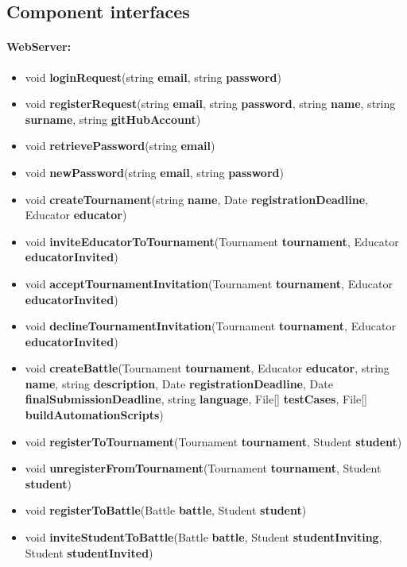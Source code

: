 \documentclass{article}
\begin{document}
\newpage

\subsection{Component interfaces}

\paragraph{WebServer:}

\begin{itemize}
    \item void \textbf{loginRequest}(string \textbf{email}, string \textbf{password})
    \item void \textbf{registerRequest}(string \textbf{email}, string \textbf{password}, string \textbf{name}, string \textbf{surname}, string \textbf{gitHubAccount})
    \item void \textbf{retrievePassword}(string \textbf{email})
    \item void \textbf{newPassword}(string \textbf{email}, string \textbf{password})
    \item void \textbf{createTournament}(string \textbf{name}, Date \textbf{registrationDeadline}, Educator \textbf{educator})
    \item void \textbf{inviteEducatorToTournament}(Tournament \textbf{tournament}, Educator \textbf{educatorInvited})
    \item void \textbf{acceptTournamentInvitation}(Tournament \textbf{tournament}, 
    Educator \textbf{educatorInvited})
    \item void \textbf{declineTournamentInvitation}(Tournament \textbf{tournament},
    Educator \textbf{educatorInvited})
    \item void \textbf{createBattle}(Tournament \textbf{tournament}, Educator \textbf{educator}, string \textbf{name}, 
    string \textbf{description}, Date \textbf{registrationDeadline}, Date \textbf{finalSubmissionDeadline}, 
    string \textbf{language}, File[] \textbf{testCases}, File[] \textbf{buildAutomationScripts})
    \item void \textbf{registerToTournament}(Tournament \textbf{tournament}, Student \textbf{student})
    \item void \textbf{unregisterFromTournament}(Tournament \textbf{tournament}, Student \textbf{student})
    \item void \textbf{registerToBattle}(Battle \textbf{battle}, Student \textbf{student})
    \item void \textbf{inviteStudentToBattle}(Battle \textbf{battle}, Student \textbf{studentInviting}, Student \textbf{studentInvited})

\end{itemize}
\end{document}
